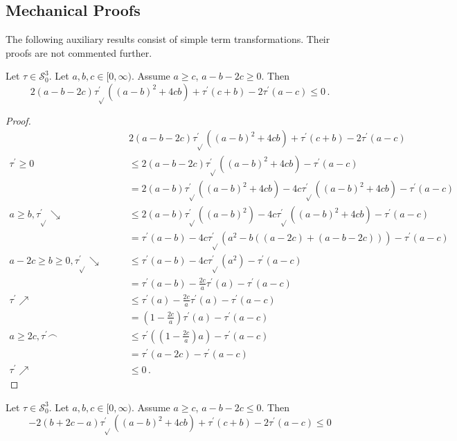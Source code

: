 \documentclass{article}
\newcommand{\lb}{\left(} %
\newcommand{\rb}{\right)} %
\newcommand{\br}[1]{\lb #1 \rb} %
\newcommand{\brOf}[1]{\!\br{#1}} %
\newcommand*{\mc}[1]{\mathcal{#1}}
\newcommand{\Rp}{[0, \infty)} %
\newcommand{\pr}{^\prime}
\newcommand{\equationFullstop}{\, .}
\newcommand{\eqfs}{\equationFullstop}
\newcommand{\tran}{\tau}
\newcommand{\trans}{\tran_{\!\sqrt{}}}
\newcommand{\dtrans}{\trans\pr}
\newcommand{\dtran}{\tran\pr}
\newcommand{\setccod}[1]{\mc S_0^{#1}}
\newcommand{\incr}{\nearrow}
\newcommand{\decr}{\searrow}
\newcommand{\posi}{\geq0}
\newcommand{\conc}{\smallfrown}
\begin{document}
\begin{appendix}
\subsection{Mechanical Proofs}\label{sec:mecha}
%
The following auxiliary results consist of simple term transformations. Their proofs are not commented further.
%
%
\begin{lemma}\label{mech:1}
	Let $\tran\in\setccod3$.
	Let $a,b,c\in\Rp$. Assume $a\geq c$, $a-b-2c \geq 0$. Then
	\begin{equation}
		2(a-b-2c)\dtrans((a-b)^2+4cb) + \dtran(c+b) - 2 \dtran(a - c) \leq 0
		\eqfs
	\end{equation}
\end{lemma}
\begin{proof}
	\begin{align*}
		&  
		2(a-b-2c)\dtrans((a-b)^2+4cb) + \dtran(c+b) - 2 \dtran(a - c) 
		\\
		\dtran\posi
		\qquad&\leq
		2(a-b-2c)\dtrans((a-b)^2+4cb) - \dtran(a - c) 
		\\
		\qquad&=
		2(a-b)\dtrans((a-b)^2+4cb) -4c\dtrans((a-b)^2+4cb) - \dtran(a - c) 
		\\
		a\geq b,\dtrans\decr
		\qquad&\leq
		2(a-b)\dtrans((a-b)^2) -4c\dtrans((a-b)^2+4cb) - \dtran(a - c) 
		\\
		\qquad&=
		\dtran(a-b) - 4c\dtrans(a^2 - b((a-2c)+(a-b-2c))) - \dtran(a - c) 
		\\
		a-2c\geq b\geq0,\dtrans\decr
		\qquad&\leq
		\dtran(a-b) - 4c\dtrans(a^2) - \dtran(a - c) 
		\\
		\qquad&=
		\dtran(a-b) - \frac{2c}a \dtran(a) - \dtran(a - c) 
		\\
		\dtran\incr
		\qquad&\leq
		\dtran(a) - \frac{2c}a \dtran(a) - \dtran(a - c) 
		\\
		\qquad&=
		\br{1 - \frac{2c}a} \dtran(a) - \dtran(a - c) 
		\\
		a\geq2c, \dtran\conc
		\qquad&\leq
		\dtran\brOf{\br{1 - \frac{2c}a}a} - \dtran(a - c) 
		\\
		\qquad&=
		\dtran\brOf{a-2c} - \dtran(a - c) 
		\\
		\dtran\incr
		\qquad&\leq
		0
		\eqfs
	\end{align*}
\end{proof}
%
%
%
\begin{lemma}\label{mech:2}
	Let $\tran\in\setccod3$.
	Let $a,b,c\in\Rp$. Assume $a\geq c$, $a-b-2c \leq 0$. Then
	\begin{equation}
		-2(b+2c-a)\dtrans((a-b)^2+4cb) + \dtran(c+b) - 2 \dtran(a - c) \leq 0

\end{equation}
\end{lemma}
\end{appendix}
\end{document}

